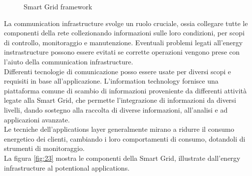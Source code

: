 \begin{figure}[h] 
\caption{Smart Grid framework}\label{fig:22}
\end{figure}

La communication infrastructure svolge un ruolo cruciale, ossia collegare tutte le componenti della rete collezionando informazioni sulle loro condizioni, per scopi di controllo, monitoraggio e manutenzione. Eventuali problemi legati all'energy instrastructure possono essere evitati se corrette operazioni vengono prese con l'aiuto della communication infrastructure. 
\\ 
Differenti tecnologie di comunicazione posso essere usate per diversi scopi e requisiti in base all'applicazione. L'information technology fornisce una piattaforma comune di scambio di informazioni proveniente da differenti attività legate alla Smart Grid, che permette l'integrazione di informazioni da diversi livelli, dando sostegno alla raccolta di diverse informazioni, all'analisi e ad applicazioni avanzate.
\\
Le tecniche dell'applications layer generalmente mirano a ridurre il consumo energetico dei clienti, cambiando i loro comportamenti di consumo, dotandoli di strumenti di monitoraggio.    
\\
La figura \ref{fig:23} mostra le componenti della Smart Grid, illustrate dall'energy infrastructure al potentional applications.

